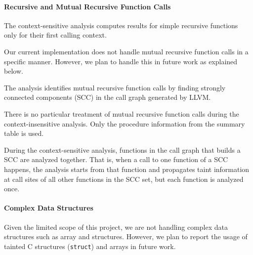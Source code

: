 \paragraph{Recursive and Mutual Recursive Function Calls} 
The context-sensitive analysis computes results for simple recursive
functions only for their first calling context.

Our current implementation does not handle mutual recursive function
calls in a specific manner. However, we plan to handle
this in future work as explained below.

The analysis identifies mutual recursive function calls by finding
strongly connected components (SCC) in the call graph generated
by LLVM.

There is no particular treatment of mutual recursive function
calls during the context-insensitive analysis. Only the
procedure information from the summary table is used.

During the context-sensitive analysis, functions in the call
graph that builds a SCC are analyzed together.
That is, when a call to one function of a SCC happens,
the analysis starts from that function and propagates taint
information at call sites of all other functions in the SCC
set, but each function is analyzed once.

\paragraph{Complex Data Structures}

Given the limited scope of this project, we are not handling
complex data structures such as array and structures.
However, we plan to report the usage of tainted C structures
(\texttt{struct}) and arrays in future work.